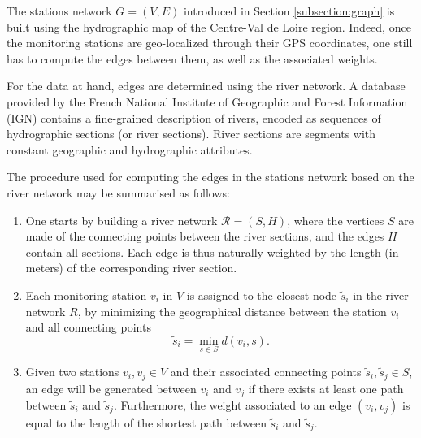 The stations network $G=(V,E)$ introduced in Section \ref{subsection:graph} is built using the hydrographic map of the Centre-Val de Loire region. Indeed, once the monitoring stations are geo-localized through their GPS coordinates, one still has to compute the edges between them, as well as the associated weights. 

For the data at hand, edges are determined using the river network. A database provided by the French National Institute of Geographic and Forest Information (IGN) \cite{IGN:BD:TOPO} contains a fine-grained description of rivers, encoded as sequences of hydrographic sections (or river sections). River sections are segments with constant geographic and hydrographic attributes. 

The procedure used for computing the edges in the stations network based on the river network may be summarised as follows:



\begin{enumerate}
    \item One starts by building a river network $\mathcal{R}=(S,H)$, where the vertices $S$ are made of the connecting points between the river sections, and the edges $H$ contain all sections. Each edge is thus naturally weighted by the length (in meters) of the corresponding river section. 
    \item Each monitoring station $v_i$ in $V$ is assigned to the closest node $\tilde s_i$ in the river network $R$, by minimizing the geographical distance between the station $v_i$ and all connecting points
    \begin{equation*}
     \tilde s_i=\min_{s\in S} d(v_i, s).
    \end{equation*}
    \item Given two stations $v_i,v_j \in V$ and their associated connecting points $\tilde s_i,\tilde s_j \in S$, an edge will be generated between $v_i$ and $v_j$ if there exists at least one path between $\tilde s_i$ and $\tilde s_j$. Furthermore, the weight associated to an edge $(v_i,v_j)$ is equal to the length of the shortest path between $\tilde s_i$ and $\tilde s_j$.
\end{enumerate}

